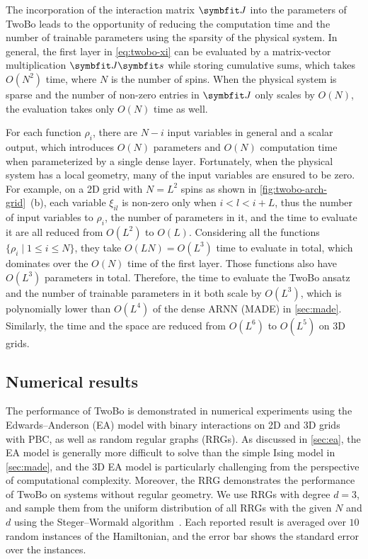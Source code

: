 The incorporation of the interaction matrix $\mJ$ into the parameters of TwoBo leads to the opportunity of reducing the computation time and the number of trainable parameters using the sparsity of the physical system. In general, the first layer in \cref{eq:twobo-xi} can be evaluated by a matrix-vector multiplication $\mJ \vs$ while storing cumulative sums, which takes $O(N^2)$ time, where $N$ is the number of spins. When the physical system is sparse and the number of non-zero entries in $\mJ$ only scales by $O(N)$, the evaluation takes only $O(N)$ time as well.

For each function $\rho_i$, there are $N - i$ input variables in general and a scalar output, which introduces $O(N)$ parameters and $O(N)$ computation time when parameterized by a single dense layer. Fortunately, when the physical system has a local geometry, many of the input variables are ensured to be zero. For example, on a 2D grid with $N = L^2$ spins as shown in \cref{fig:twobo-arch-grid}~(b), each variable $\xi_{i l}$ is non-zero only when $i < l < i + L$, thus the number of input variables to $\rho_i$, the number of parameters in it, and the time to evaluate it are all reduced from $O(L^2)$ to $O(L)$. Considering all the functions $\{\rho_i \mid 1 \le i \le N\}$, they take $O(L N) = O(L^3)$ time to evaluate in total, which dominates over the $O(N)$ time of the first layer. Those functions also have $O(L^3)$ parameters in total. Therefore, the time to evaluate the TwoBo ansatz and the number of trainable parameters in it both scale by $O(L^3)$, which is polynomially lower than $O(L^4)$ of the dense ARNN (MADE) in \cref{sec:made}. Similarly, the time and the space are reduced from $O(L^6)$ to $O(L^5)$ on 3D grids.

\subsection{Numerical results}
\label{sec:twobo-results}

The performance of TwoBo is demonstrated in numerical experiments using the Edwards--Anderson (EA) model with binary interactions on 2D and 3D grids with PBC, as well as random regular graphs (RRGs). As discussed in \cref{sec:ea}, the EA model is generally more difficult to solve than the simple Ising model in \cref{sec:made}, and the 3D EA model is particularly challenging from the perspective of computational complexity. Moreover, the RRG demonstrates the performance of TwoBo on systems without regular geometry. We use RRGs with degree $d = 3$, and sample them from the uniform distribution of all RRGs with the given $N$ and $d$ using the Steger--Wormald algorithm~\cite{steger1999generating}. Each reported result is averaged over $10$ random instances of the Hamiltonian, and the error bar shows the standard error over the instances.

